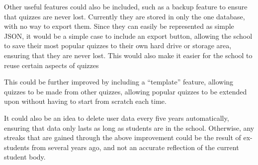 Other useful features could also be included, such as a backup feature to ensure that quizzes are never lost. Currently they are stored in only the one database, with no way to export them. Since they can easily be represented as simple JSON, it would be a simple case to include an export button, allowing the school to save their most popular quizzes to their own hard drive or storage area, ensuring that they are never lost. This would also make it easier for the school to reuse certain aspects of quizzes

This could be further improved by including a ``template'' feature, allowing quizzes to be made from other quizzes, allowing popular quizzes to be extended upon without having to start from scratch each time.

It could also be an idea to delete user data every five years automatically, ensuring that data only lasts as long as students are in the school. Otherwise, any streaks that are gained through the above improvement could be the result of ex-students from several years ago, and not an accurate reflection of the current student body.
